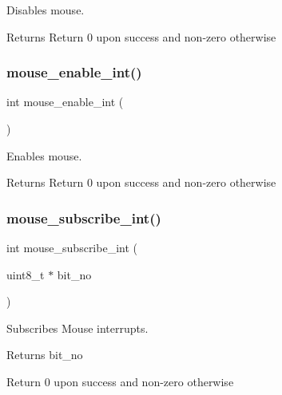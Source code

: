 Disables mouse. 

\begin{DoxyReturn}{Returns}
Return 0 upon success and non-\/zero otherwise 
\end{DoxyReturn}
\mbox{\label{group__mouse_gaf19e0109275a1162be7188deb9c02b41}} 
\subsubsection{\texorpdfstring{mouse\_enable\_int()}{mouse\_enable\_int()}}
{\footnotesize\ttfamily int mouse\+\_\+enable\+\_\+int (\begin{DoxyParamCaption}{ }\end{DoxyParamCaption})}



Enables mouse. 

\begin{DoxyReturn}{Returns}
Return 0 upon success and non-\/zero otherwise 
\end{DoxyReturn}
\mbox{\label{group__mouse_ga9da18257ff113b686bb826d154bfaa87}} 
\subsubsection{\texorpdfstring{mouse\_subscribe\_int()}{mouse\_subscribe\_int()}}
{\footnotesize\ttfamily int mouse\+\_\+subscribe\+\_\+int (\begin{DoxyParamCaption}\item[{uint8\+\_\+t $\ast$}]{bit\+\_\+no }\end{DoxyParamCaption})}



Subscribes Mouse interrupts. 

\begin{DoxyReturn}{Returns}
bit\+\_\+no 

Return 0 upon success and non-\/zero otherwise 
\end{DoxyReturn}
\mbox{\label{group__mouse_ga685ad2706aca36d9869a30a19b9f446a}} 
